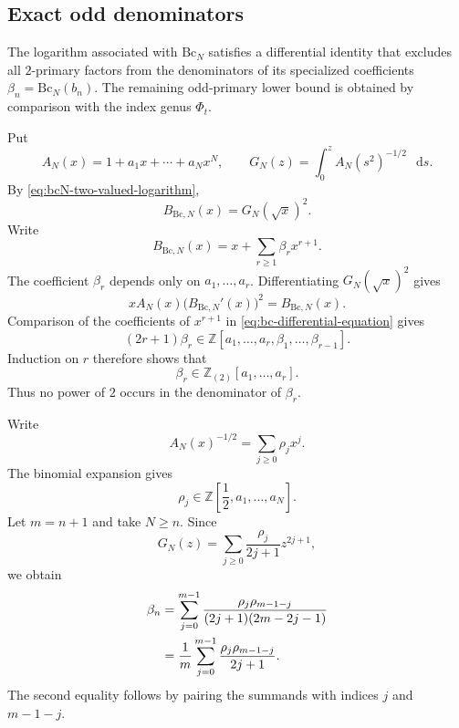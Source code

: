 \documentclass[14pt,dvipsnames]{extarticle}
\makeatletter
\numberwithin{equation}{subsection}
\theoremstyle{plain}
\theoremstyle{definition}
\theoremstyle{definition}
\renewenvironment{proof}[1][\proofname]{
 \par\pushQED{\qed}\normalfont
 \topsep6\p@\@plus6\p@\relax
 \trivlist\item[\hskip\labelsep\bfseries\itshape #1\@addpunct{.}]
}{\popQED\endtrivlist\@endpefalse}
\newcommand{\dd}{\mathop{}\!\mathrm d}
\newcommand{\Bc}{\mathrm{Bc}}
\newcommand{\Ztwo}{\mathbb{Z}_{(2)}}
\makeatother
\begin{document}
\subsection{Exact odd denominators}
\label{sec:odd-denominators}

The logarithm associated with $\Bc_N$ satisfies a differential identity that
excludes all $2$-primary factors from the denominators of its specialized
coefficients $\beta_n=\Bc_N(b_n)$. The remaining odd-primary lower bound is
obtained by comparison with the index genus $\Phi_t$.

\begin{proof}[Proof of \cref{thm:bc-odd-denominator}]
Put
\[
 A_N(x)=1+a_1x+\cdots+a_Nx^N,
 \qquad
 G_N(z)=\int_0^z A_N(s^2)^{-1/2}\,\dd s.
\]
By \eqref{eq:bcN-two-valued-logarithm},
\[
 B_{\Bc,N}(x)=G_N(\sqrt{x})^2.
\]
Write
\[
 B_{\Bc,N}(x)=x+\sum_{r\geq1}\beta_r x^{r+1}.
\]
The coefficient $\beta_r$ depends only on $a_1,\ldots,a_r$. Differentiating
$G_N(\sqrt{x})^2$ gives
\begin{equation}\label{eq:bc-differential-equation}
 xA_N(x)\bigl(B_{\Bc,N}'(x)\bigr)^2=B_{\Bc,N}(x).
\end{equation}
Comparison of the coefficients of $x^{r+1}$ in
\eqref{eq:bc-differential-equation} gives
\begin{equation}\label{eq:bc-recursion-denominator}
 (2r+1)\beta_r
 \in\mathbb Z[a_1,\ldots,a_r,\beta_1,\ldots,\beta_{r-1}].
\end{equation}
Induction on $r$ therefore shows that
\begin{equation}\label{eq:bc-no-two-denominators}
 \beta_r\in\Ztwo[a_1,\ldots,a_r].
\end{equation}
Thus no power of $2$ occurs in the denominator of $\beta_r$.

Write
\begin{equation}\label{eq:def-rho-j}
 A_N(x)^{-1/2}=\sum_{j\geq0}\rho_jx^j.
\end{equation}
The binomial expansion gives
\[
 \rho_j\in\mathbb Z\left[\frac12,a_1,\ldots,a_N\right].
\]
Let $m=n+1$ and take $N\geq n$. Since
\[
 G_N(z)=\sum_{j\geq0}\frac{\rho_j}{2j+1}z^{2j+1},
\]
we obtain
\begin{align}
 \beta_n
 &=\sum_{j=0}^{m-1}
   \frac{\rho_j\rho_{m-1-j}}
        {(2j+1)(2m-2j-1)}\notag\\
 &=\frac1m\sum_{j=0}^{m-1}
   \frac{\rho_j\rho_{m-1-j}}{2j+1}.
 \label{eq:bc-coefficient-formula}
\end{align}
The second equality follows by pairing the summands with indices $j$ and
$m-1-j$.


\end{proof}
\end{document}
